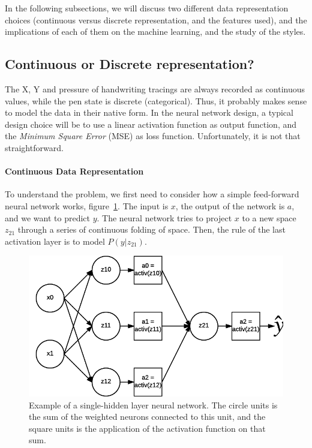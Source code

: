   \par In the following subsections, we will discuss two different data representation choices (continuous versus discrete representation, and the features used), and the implications of each of them on the machine learning, and the study of the styles.

  \subsection{Continuous or Discrete representation?}

    \par The X, Y and pressure of handwriting tracings are always recorded as continuous values, while the pen state is discrete (categorical). Thus, it probably makes sense to model the data in their native form. In the neural network design, a typical design choice will be to use a linear activation function as output function, and the \textit{Minimum Square Error} (MSE) as loss function. Unfortunately, it is not that straightforward.

    \paragraph{Continuous Data Representation}
      \par To understand the problem, we first need to consider how a simple feed-forward neural network works, figure~\ref{fig:mlp_simple}. The input is $x$, the output of the network is $a$, and we want to predict $y$. The neural network tries to project $x$ to a new space $z_{21}$ through a series of continuous folding of space. Then, the rule of the last activation layer is to model $P(y|z_{21})$.

      \begin{figure}[!htbp]
          \centering
          \includegraphics[scale=0.8]{images/sota/Multi-layer-perceptron2.png}
          \caption{Example of a single-hidden layer neural network. The circle units is the sum of the weighted neurons connected to this unit, and the square units is the application of the activation function on that sum.}%
          \label{fig:mlp_simple}
      \end{figure}

